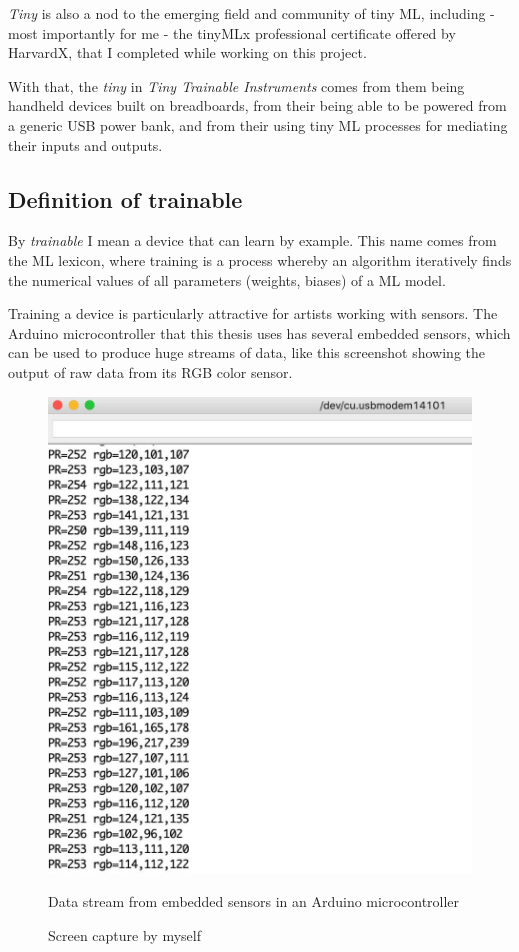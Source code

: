 \emph{Tiny} is also a nod to the emerging field and community of tiny \acrshort{ML}, including - most importantly for me - the tinyMLx professional certificate\cite{website-edx-harvardx-tinymlx-professional-certificate} offered by HarvardX, that I completed while working on this project.

With that, the \emph{tiny} in \emph{Tiny Trainable Instruments} comes from them being handheld devices built on breadboards, from their being able to be powered from a generic USB power bank, and from their using tiny \acrshort{ML} processes for mediating their inputs and outputs.

\subsection{Definition of trainable}

By \emph{trainable} I mean a device that can learn by example. This name comes from the \acrshort{ML} lexicon, where training is a process whereby an algorithm  iteratively finds the numerical values of all parameters (weights, biases) of a \acrshort{ML} model.

Training a device is particularly attractive for artists working with sensors. The Arduino microcontroller that this thesis uses has several embedded sensors, which can be used to produce huge streams of data, like this screenshot showing the output of raw data from its \acrshort{RGB} color sensor.

\begin{figure}[ht]
  \centering
  \includegraphics[width=0.75\linewidth,height=0.40\textheight,keepaspectratio]{images/arduino-data-stream.jpg}
  \caption{Data stream from embedded sensors in an Arduino microcontroller}
  \caption*{Screen capture by myself}
  \label{fig:arduino-data-stream}
\end{figure}


